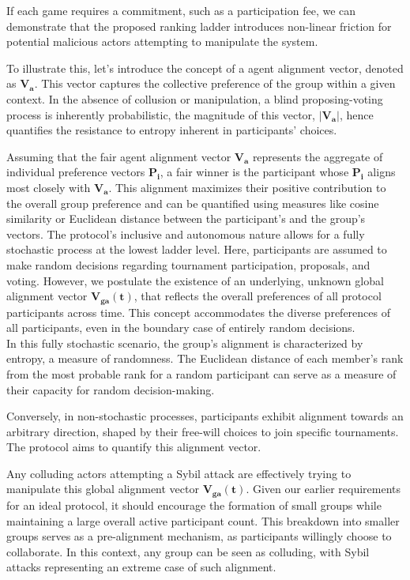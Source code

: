 \documentclass{article}
\begin{document}
\begin{CJK}{UTF8}{gbsn}
\begin{multicols}{2}
        If each game requires a commitment, such as a participation fee, we can demonstrate that the proposed ranking ladder introduces non-linear friction for potential malicious actors attempting to manipulate the system.

        To illustrate this, let's introduce the concept of a agent alignment vector, denoted as  $\mathbf{V_a}$. This vector captures the collective preference of the group within a given context. In the absence of collusion or manipulation, a blind proposing-voting process is inherently probabilistic, the magnitude of this vector, $|\mathbf{V_a}|$, hence quantifies the resistance to entropy inherent in participants' choices.

        Assuming that the fair agent alignment vector $\mathbf{V_a}$  represents the aggregate of individual preference vectors $\mathbf{P_i}$, a fair winner is the participant whose  $\mathbf{P_i}$ aligns most closely with $\mathbf{V_a}$. This alignment maximizes their positive contribution to the overall group preference and can be quantified using measures like cosine similarity or Euclidean distance between the participant's and the group's vectors.
        The protocol's inclusive and autonomous nature allows for a fully stochastic process at the lowest ladder level. Here, participants are assumed to make random decisions regarding tournament participation, proposals, and voting.
        However, we postulate the existence of an underlying, unknown global alignment vector $\mathbf{V_{ga}(t)}$, that reflects the overall preferences of all protocol participants across time. This concept accommodates the diverse preferences of all participants, even in the boundary case of entirely random decisions.\\
        In this fully stochastic scenario, the group's alignment is characterized by entropy, a measure of randomness. The Euclidean distance of each member's rank from the most probable rank for a random participant can serve as a measure of their capacity for random decision-making.

        Conversely, in non-stochastic processes, participants exhibit alignment towards an arbitrary direction, shaped by their free-will choices to join specific tournaments. The protocol aims to quantify this alignment vector.

        Any colluding actors attempting a Sybil attack are effectively trying to manipulate this global alignment vector $\mathbf{V_{ga}(t)}$. Given our earlier requirements for an ideal protocol, it should encourage the formation of small groups while maintaining a large overall active participant count. This breakdown into smaller groups serves as a pre-alignment mechanism, as participants willingly choose to collaborate. In this context, any group can be seen as colluding, with Sybil attacks representing an extreme case of such alignment.


\end{multicols}
\end{CJK}
\end{document}
